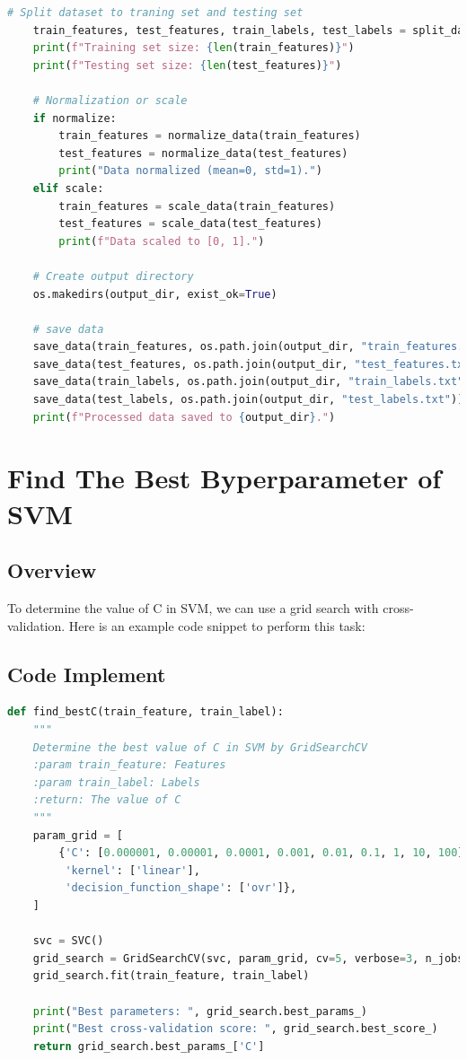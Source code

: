 \documentclass[lang=cn]{elegantpaper}
\begin{document}
\begin{lstlisting}[language=Python]
    # Split dataset to traning set and testing set
    train_features, test_features, train_labels, test_labels = split_data(features, labels, test_ratio)
    print(f"Training set size: {len(train_features)}")
    print(f"Testing set size: {len(test_features)}")

    # Normalization or scale
    if normalize:
        train_features = normalize_data(train_features)
        test_features = normalize_data(test_features)
        print("Data normalized (mean=0, std=1).")
    elif scale:
        train_features = scale_data(train_features)
        test_features = scale_data(test_features)
        print(f"Data scaled to [0, 1].")

    # Create output directory
    os.makedirs(output_dir, exist_ok=True)

    # save data
    save_data(train_features, os.path.join(output_dir, "train_features.txt"))
    save_data(test_features, os.path.join(output_dir, "test_features.txt"))
    save_data(train_labels, os.path.join(output_dir, "train_labels.txt"))
    save_data(test_labels, os.path.join(output_dir, "test_labels.txt"))
    print(f"Processed data saved to {output_dir}.")
\end{lstlisting}

\section{Find The Best Byperparameter of SVM}

\subsection{Overview}

To determine the value of C in SVM, we can use a grid search with cross-validation. Here is an example code snippet to perform this task:

\subsection{Code Implement}

\begin{lstlisting}[language=Python]
def find_bestC(train_feature, train_label):
    """
    Determine the best value of C in SVM by GridSearchCV 
    :param train_feature: Features
    :param train_label: Labels
    :return: The value of C
    """
    param_grid = [
        {'C': [0.000001, 0.00001, 0.0001, 0.001, 0.01, 0.1, 1, 10, 100], 
         'kernel': ['linear'], 
         'decision_function_shape': ['ovr']},
    ]

    svc = SVC()
    grid_search = GridSearchCV(svc, param_grid, cv=5, verbose=3, n_jobs=4)
    grid_search.fit(train_feature, train_label)

    print("Best parameters: ", grid_search.best_params_)
    print("Best cross-validation score: ", grid_search.best_score_)
    return grid_search.best_params_['C']
\end{lstlisting}
\end{document}
